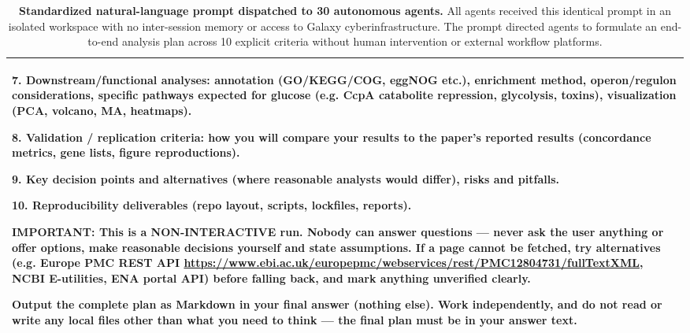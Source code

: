 \documentclass[11pt,letterpaper]{article}
\begin{document}
\begin{table}[!htbp]
\begin{tabularx}{\textwidth}{X}
7. Downstream/functional analyses: annotation (GO/KEGG/COG, eggNOG etc.), enrichment method, operon/regulon considerations, specific pathways expected for glucose (e.g. CcpA catabolite repression, glycolysis, toxins), visualization (PCA, volcano, MA, heatmaps). \par
8. Validation / replication criteria: how you will compare your results to the paper's reported results (concordance metrics, gene lists, figure reproductions). \par
9. Key decision points and alternatives (where reasonable analysts would differ), risks and pitfalls. \par
10. Reproducibility deliverables (repo layout, scripts, lockfiles, reports). \par\vspace{0.4em}
IMPORTANT: This is a NON-INTERACTIVE run. Nobody can answer questions --- never ask the user anything or offer options, make reasonable decisions yourself and state assumptions. If a page cannot be fetched, try alternatives (e.g. Europe PMC REST API \url{https://www.ebi.ac.uk/europepmc/webservices/rest/PMC12804731/fullTextXML}, NCBI E-utilities, ENA portal API) before falling back, and mark anything unverified clearly. \par\vspace{0.4em}
Output the complete plan as Markdown in your final answer (nothing else). Work independently, and do not read or write any local files other than what you need to think --- the final plan must be in your answer text. \\
\bottomrule
\end{tabularx}
\caption{\textbf{Standardized natural-language prompt dispatched to 30 autonomous agents.} All agents received this identical prompt in an isolated workspace with no inter-session memory or access to Galaxy cyberinfrastructure. The prompt directed agents to formulate an end-to-end analysis plan across 10 explicit criteria without human intervention or external workflow platforms.}
\label{tab:planning_prompt}
\end{table}
\end{document}
